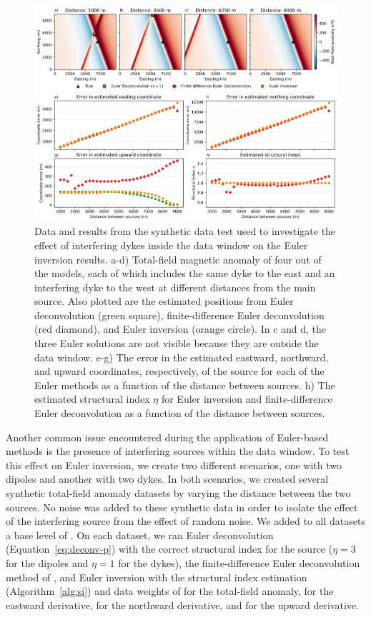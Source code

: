 \begin{figure}[tb!]
\centering
\includegraphics[width=1\linewidth]{figures/synthetic-interfering-sources-dykes.png}
\caption{
    Data and results from the synthetic data test used to investigate the
    effect of interfering dykes inside the data window on the Euler inversion
    results.
    a-d) Total-field magnetic anomaly of four out of the \SynInterfDykesNModels{}
    models, each of which includes the same dyke to the east and an interfering
    dyke to the west at different distances from the main source. Also plotted
    are the estimated positions from Euler deconvolution (green square),
    finite-difference Euler deconvolution (red diamond), and Euler inversion
    (orange circle).
    In c and d, the three Euler solutions are not visible because they are
    outside the data window.
    e-g) The error in the estimated eastward, northward, and upward
    coordinates, respectively, of the source for each of the Euler methods as
    a function of the distance between sources.
    h) The estimated structural index $\eta$ for Euler inversion and
    finite-difference Euler deconvolution as a function of the distance between
    sources.
}
\label{fig:interf-dykes}
\end{figure}

Another common issue encountered during the application of Euler-based methods
is the presence of interfering sources within the data window.
To test this effect on Euler inversion, we create two different scenarios, one
with two dipoles and another with two dykes.
In both scenarios, we created several synthetic total-field anomaly datasets
by varying the distance between the two sources.
No noise was added to these synthetic data in order to isolate the effect of
the interfering source from the effect of random noise.
We added to all datasets a base level of \SynInterfTrueBase{}.
On each dataset, we ran Euler deconvolution (Equation~\ref{eq:deconv-p}) with
the correct structural index for the source ($\eta=3$ for the dipoles and
$\eta=1$ for the dykes), the finite-difference Euler deconvolution method of
\citet{Gerovska2005}, and Euler inversion with the structural index estimation
(Algorithm~\ref{alg:si}) and data weights of \DefaultWeightsF{} for the
total-field anomaly, \DefaultWeightsE{} for the eastward derivative,
\DefaultWeightsN{} for the northward derivative, and \DefaultWeightsU{} for the
upward derivative.

